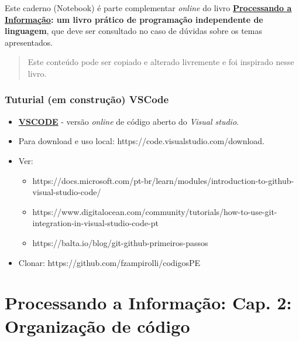 \documentclass[12pt,a4paper]{article}
\providecommand{\tightlist}{%
      \setlength{\itemsep}{0pt}\setlength{\parskip}{0pt}}
\begin{document}
Este caderno (Notebook) é parte complementar \emph{online} do livro
\textbf{\href{https://editora.ufabc.edu.br/matematica-e-ciencias-da-computacao/58-processando-a-informacao}{Processando
a Informação}: um livro prático de programação independente de
linguagem}, que deve ser consultado no caso de dúvidas sobre os temas
apresentados.

\begin{quote}
Este conteúdo pode ser copiado e alterado livremente e foi inspirado
nesse livro.
\end{quote}

    \hypertarget{tuturial-em-construuxe7uxe3o-vscode}{%
\subsubsection{Tuturial (em construção)
VSCode}\label{tuturial-em-construuxe7uxe3o-vscode}}

    \begin{itemize}
\item
  \textbf{\href{https://vscode.dev}{VSCODE}} - versão \emph{online} de
  código aberto do \emph{Visual studio}.
\item
  Para download e uso local: https://code.visualstudio.com/download.
\item
  Ver:

  \begin{itemize}
  \tightlist
  \item
    https://docs.microsoft.com/pt-br/learn/modules/introduction-to-github-visual-studio-code/
  \item
    https://www.digitalocean.com/community/tutorials/how-to-use-git-integration-in-visual-studio-code-pt
  \item
    https://balta.io/blog/git-github-primeiros-passos
  \end{itemize}
\item
  Clonar: https://github.com/fzampirolli/codigosPE
\end{itemize}

    \hypertarget{processando-a-informauxe7uxe3o-cap.-2-organizauxe7uxe3o-de-cuxf3digo}{%
\section{Processando a Informação: Cap. 2: Organização de
código}\label{processando-a-informauxe7uxe3o-cap.-2-organizauxe7uxe3o-de-cuxf3digo}}
\end{document}
